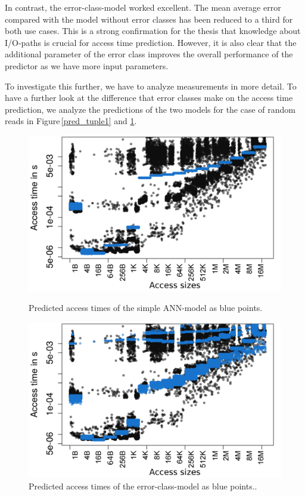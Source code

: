\documentclass{superfri}
\begin{document}
In contrast, the error-class-model worked excellent. The mean average error compared with the model without error classes has been reduced to a third for both use cases.
This is a strong confirmation for the thesis that knowledge about I/O-paths is crucial for access time prediction.
However, it is also clear that the additional parameter of the error class improves the overall performance of the predictor as we have more input parameters. 

\medskip

To investigate this further, we have to analyze measurements in more detail.
To have a further look at the difference that error classes make on the access time prediction, we analyze the predictions of the two models for the case of random reads in Figure\,\ref{pred_tuple1} and \ref{pred_error}.
\begin{figure}[!h]
	\centering
	\begin{minipage}[b]{0.47\textwidth}
		\includegraphics[width=\textwidth]{src/plot_onlyPred_tuple1_Duration_rnd.png}
		\caption{Predicted access times of the simple ANN-model as blue points.}
		\label{pred_tuple1}
	\end{minipage}
	\hfill
	\begin{minipage}[b]{0.47\textwidth}
		\includegraphics[width=\textwidth]{src/plot_onlyPred_tuple1_with_error_class_from_linreg_Duration_rnd.png}
		\caption{Predicted access times of the error-class-model as blue points..}
		\label{pred_error}
	\end{minipage}
\end{figure}
\end{document}
